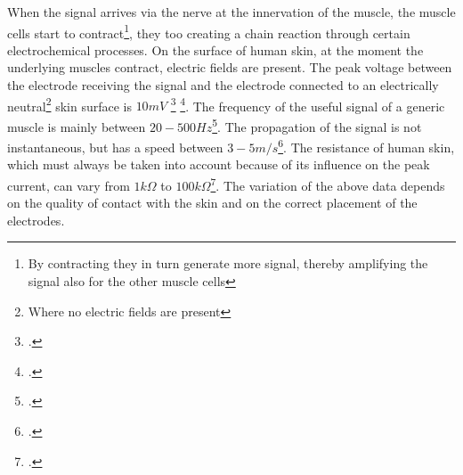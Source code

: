 \documentclass[a4paper, 10pt, final]{article} %
\begin{document}
    When the signal arrives via the nerve at the innervation of the muscle, the muscle cells start to contract\footnote{By contracting they in turn generate more signal, thereby amplifying the signal also for the other muscle cells}, they too creating a chain reaction through certain electrochemical processes.
    On the surface of human skin, at the moment the underlying muscles contract, electric fields are present.
    The peak voltage between the electrode receiving the signal and the electrode connected to an electrically neutral\footnote{Where no electric fields are present} skin surface is $10mV$ \footcite[p435]{Naik}\: \footcite[p1]{Xiaoou}.
    The frequency of the useful signal of a generic muscle is mainly between $20-500Hz$\footcite[p1]{EMGFreq}.
    The propagation of the signal is not instantaneous, but has a speed between $3-5m/s$\footcite[p2]{MerlettiMuceli}.
    The resistance of human skin, which must always be taken into account because of its influence on the peak current, can vary from $1k\Omega$ to $100k\Omega$\footcite["Under dry conditions, the resistance offered by the human body may be as high as 100,000Ohms.  Wet or broken skin may drop the body's resistance to 1,000 Ohms", p7]{ElectricalDeaths}.
    The variation of the above data depends on the quality of contact with the skin and on the correct placement of the electrodes.
\end{document}
